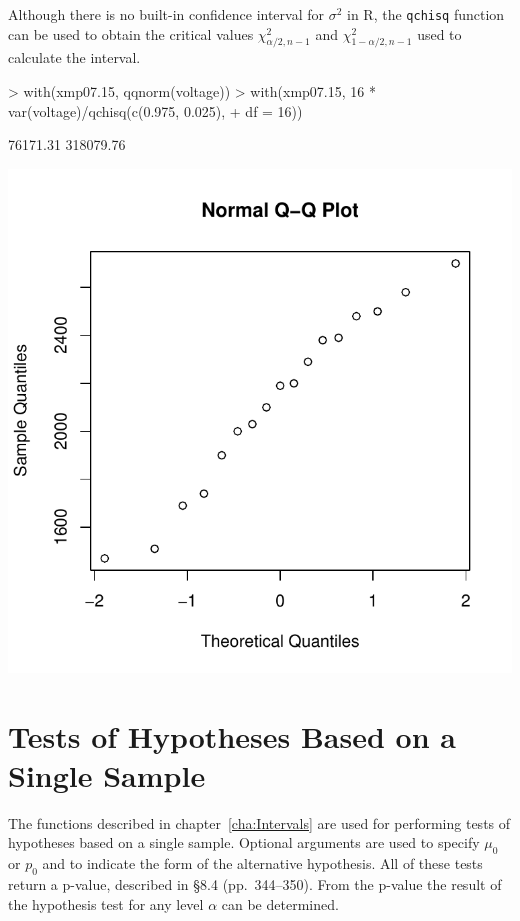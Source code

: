 \documentclass{book}
\begin{document}
Although there is no built-in confidence interval for $\sigma^2$ in R,
the \texttt{qchisq} function can be used to obtain the critical values
$\chi^2_{\alpha/2,n-1}$ and $\chi^2_{1-\alpha/2,n-1}$ used to
calculate the interval.
\begin{center}
\begin{Schunk}
\begin{Sinput}
> with(xmp07.15, qqnorm(voltage))
> with(xmp07.15, 16 * var(voltage)/qchisq(c(0.975, 0.025), 
+     df = 16))
\end{Sinput}
\begin{Soutput}
[1]  76171.31 318079.76
\end{Soutput}
\end{Schunk}
\includegraphics{Devore6-xmp0715}
\end{center}

\chapter[Tests of Hypotheses]{Tests of Hypotheses Based on a Single Sample}
\label{cha:Tests}

The functions described in chapter~\ref{cha:Intervals} are used for
performing tests of hypotheses based on a single sample.  Optional
arguments are used to specify $\mu_0$ or $p_0$ and to indicate the
form of the alternative hypothesis.  All of these tests return a
p-value, described in \S8.4 (pp.~344--350).  From the p-value the
result of the hypothesis test for any level $\alpha$ can be determined.
\end{document}

